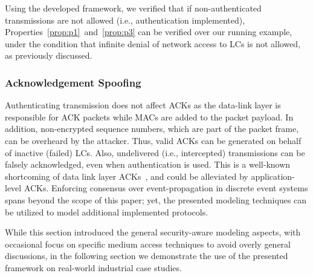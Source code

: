 Using the developed framework, we verified that if non-authenticated transmissions are not allowed (i.e., authentication implemented), Properties~\ref{prop:p1}~and~\ref{prop:p3} can be verified over our running example, under the condition that infinite denial of network access to LCs is not allowed, as previously discussed.


\subsubsection{Acknowledgement Spoofing}
Authenticating transmission does not affect ACKs as the data-link layer is responsible for ACK packets while MACs are added to the packet payload. In addition, non-encrypted sequence numbers, which are part of the packet frame, can be overheard by the attacker. Thus, valid ACKs can be generated on behalf of inactive (failed) LCs. Also, undelivered (i.e., intercepted) transmissions can be falsely acknowledged, even when authentication is used. This is a well-known shortcoming of data link layer ACKs~\cite{ackattack2,802.15.4sec}, and could be alleviated by application-level ACKs. Enforcing consensus over event-propagation in discrete event systems spans beyond the scope of this paper; yet, the presented modeling techniques can be utilized to model additional implemented protocols.

While this section introduced the general security-aware modeling aspects, with occasional focus on specific medium access techniques to avoid overly general discussions, in the following section we demonstrate the use of the presented framework on real-world industrial case studies.
